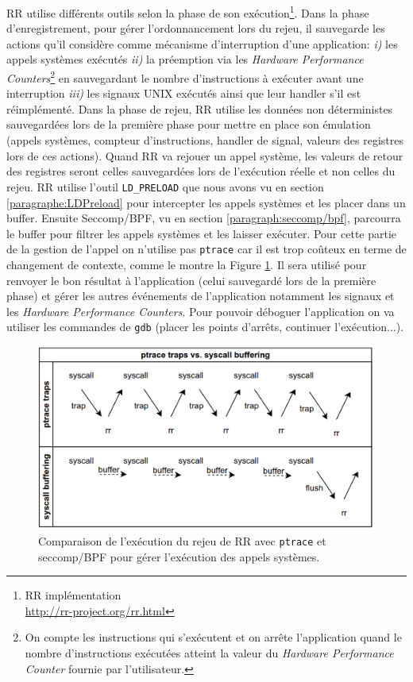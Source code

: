 RR utilise différents outils selon la phase de son exécution\footnote{RR
  implémentation \\ \url{http://rr-project.org/rr.html}}. Dans la phase
d'enregistrement, pour gérer l'ordonnancement lors du rejeu, il sauvegarde les
actions qu'il considère comme mécanisme d'interruption d'une application:
\textit{i)} les appels systèmes exécutés \textit{ii)} la préemption via les
\textit{Hardware Performance Counters}\footnote{On compte les instructions qui
  s'exécutent et on arrête l'application quand le nombre d'instructions exécutées
  atteint la valeur du \textit{Hardware Performance Counter} fournie par
  l'utilisateur.} en sauvegardant le nombre d'instructions à exécuter avant une
interruption \textit{iii)} les signaux UNIX exécutés ainsi que leur handler s'il
est réimplémenté. Dans la phase de rejeu, RR utilise les données non
déterministes sauvegardées lors de la première phase pour mettre en place son
émulation (appels systèmes, compteur d'instructions, handler de signal, valeurs
des registres lors de ces actions). Quand RR va rejouer un appel système, les
valeurs de retour des registres seront celles sauvegardées lors de l'exécution
réelle et non celles du rejeu. RR utilise l'outil \texttt{LD\_PRELOAD} que nous
avons vu en section \ref{paragraphe:LDPreload} pour intercepter les appels
systèmes et les placer dans un buffer. Ensuite Seccomp/BPF, vu en section
\ref{paragraph:seccomp/bpf}, parcourra le buffer pour filtrer les appels systèmes
et les laisser exécuter. Pour cette partie de la gestion de l'appel on n'utilise
pas \texttt{ptrace} car il est trop coûteux en terme de changement de contexte,
comme le montre la Figure \ref{AS_RR}. Il sera utilisé pour renvoyer le bon
résultat à l'application (celui sauvegardé lors de la première phase) et gérer
les autres événements de l'application notamment les signaux et les
\textit{Hardware Performance Counters}. Pour pouvoir déboguer l'application on
va utiliser les commandes de \texttt{gdb} (placer les points d'arrêts, continuer
l'exécution...).

\begin{figure}
\centering \includegraphics[scale=0.30]{Pictures/png/RR_AS}
\caption[Comparaison de l'exécution du rejeu de RR]{Comparaison de l'exécution du rejeu de RR avec \texttt{ptrace} et seccomp/BPF
  pour gérer l'exécution des appels systèmes.}
\label{AS_RR}
\end{figure}

